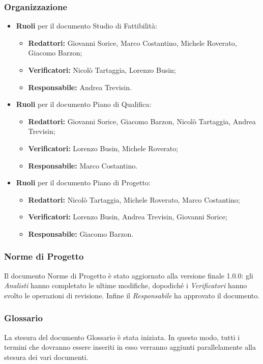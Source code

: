 \subsubsection{Organizzazione}
\begin{itemize}

	\item { \textbf{Ruoli} per il documento Studio di Fattibilità:} 
	\begin{itemize}
		\item { \textbf{Redattori:} Giovanni Sorice, Marco Costantino, Michele Roverato, Giacomo Barzon;}
		\item { \textbf{Verificatori:} Nicolò Tartaggia, Lorenzo Busin;}
		\item { \textbf{Responsabile:} Andrea Trevisin.} 
	\end{itemize}
	
	\item { \textbf{Ruoli} per il documento Piano di Qualifica:} 
	\begin{itemize}
		\item { \textbf{Redattori:} Giovanni Sorice, Giacomo Barzon, Nicolò Tartaggia, Andrea Trevisin;}
		\item { \textbf{Verificatori:} Lorenzo Busin, Michele Roverato;}
		\item { \textbf{Responsabile:} Marco Costantino.}
	\end{itemize}

\item { \textbf{Ruoli} per il documento Piano di Progetto:} 
	\begin{itemize}
		\item { \textbf{Redattori:} Nicolò Tartaggia, Michele Roverato, Marco Costantino;}
		\item { \textbf{Verificatori:} Lorenzo Busin, Andrea Trevisin, Giovanni Sorice;}
		\item { \textbf{Responsabile:} Giacomo Barzon.}
	\end{itemize}
\end{itemize}

\subsubsection{Norme di Progetto}
Il documento Norme di Progetto è stato aggiornato alla versione finale 1.0.0: gli \emph{Analisti} hanno completato le ultime modifiche, dopodiché i \emph{Verificatori} hanno svolto le operazioni di revisione. Infine il \emph{Responsabile} ha approvato il documento.

\subsubsection{Glossario}
La stesura del documento Glossario è stata iniziata. In questo modo, tutti i termini che dovranno essere inseriti in esso verranno aggiunti parallelamente alla stesura dei vari documenti. 